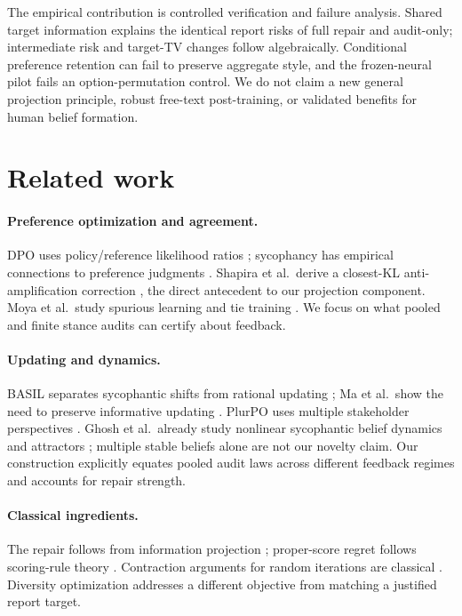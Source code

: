 \documentclass{article}
\newcommand{\citep}{\cite}
\begin{document}
The empirical contribution is controlled verification and failure analysis.
Shared target information explains the identical report risks of full
repair and audit-only; intermediate risk and target-TV changes follow
algebraically. Conditional preference retention can fail to preserve
aggregate style, and the frozen-neural pilot fails an option-permutation
control. We do not claim a new general projection principle, robust
free-text post-training, or validated benefits for human belief formation.

\section{Related work}
\paragraph{Preference optimization and agreement.}
DPO uses policy/reference likelihood ratios \citep{rafailov2023}; sycophancy
has empirical connections to preference judgments \citep{sharma2024}.
Shapira et al.\ derive a closest-KL anti-amplification correction
\citep{shapira2026}, the direct antecedent to our projection component.
Moya et al.\ study spurious learning and tie training \citep{moya2026}.
We focus on what pooled and finite stance audits can certify about feedback.

\paragraph{Updating and dynamics.}
BASIL separates sycophantic shifts from rational updating \citep{atwell2026};
Ma et al.\ show the need to preserve informative updating \citep{ma2026}.
PlurPO uses multiple stakeholder perspectives \citep{hatgis2026}.
Ghosh et al.\ already study nonlinear sycophantic belief dynamics and
attractors \citep{ghosh2026}; multiple stable beliefs alone are not our
novelty claim. Our construction explicitly equates pooled audit laws
across different feedback regimes and accounts for repair strength.

\paragraph{Classical ingredients.}
The repair follows from information projection \citep{csiszar1975};
proper-score regret follows scoring-rule theory \citep{gneiting2007}.
Contraction arguments for random iterations are classical
\citep{diaconis1999}. Diversity optimization \citep{lanchantin2025} addresses
a different objective from matching a justified report target.
\end{document}

